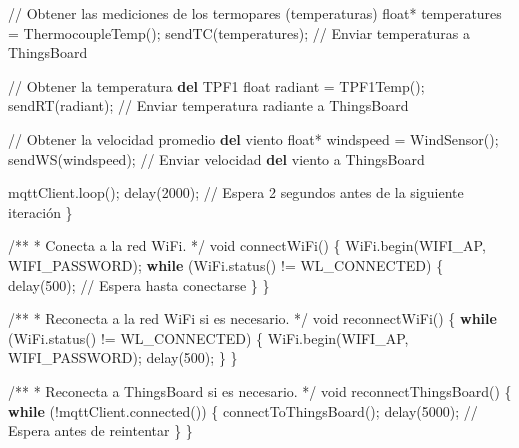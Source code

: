 \documentclass[
  letterpaper,
]{scrbook}
\newenvironment{Shaded}{\begin{snugshade}}{\end{snugshade}}
\newcommand{\BuiltInTok}[1]{\textcolor[rgb]{0.00,0.23,0.31}{#1}}
\newcommand{\ControlFlowTok}[1]{\textcolor[rgb]{0.00,0.23,0.31}{\textbf{#1}}}
\newcommand{\DecValTok}[1]{\textcolor[rgb]{0.68,0.00,0.00}{#1}}
\newcommand{\KeywordTok}[1]{\textcolor[rgb]{0.00,0.23,0.31}{\textbf{#1}}}
\newcommand{\NormalTok}[1]{\textcolor[rgb]{0.00,0.23,0.31}{#1}}
\newcommand{\OperatorTok}[1]{\textcolor[rgb]{0.37,0.37,0.37}{#1}}
\begin{document}
\begin{Shaded}
\begin{Highlighting}[]
  \OperatorTok{//}\NormalTok{ Obtener las mediciones de los termopares (temperaturas)}
  \BuiltInTok{float}\OperatorTok{*}\NormalTok{ temperatures }\OperatorTok{=}\NormalTok{ ThermocoupleTemp()}\OperatorTok{;}
\NormalTok{  sendTC(temperatures)}\OperatorTok{;}    \OperatorTok{//}\NormalTok{ Enviar temperaturas a ThingsBoard}

  \OperatorTok{//}\NormalTok{ Obtener la temperatura }\KeywordTok{del}\NormalTok{ TPF1}
  \BuiltInTok{float}\NormalTok{ radiant }\OperatorTok{=}\NormalTok{ TPF1Temp()}\OperatorTok{;}
\NormalTok{  sendRT(radiant)}\OperatorTok{;}  \OperatorTok{//}\NormalTok{ Enviar temperatura radiante a ThingsBoard}

  \OperatorTok{//}\NormalTok{ Obtener la velocidad promedio }\KeywordTok{del}\NormalTok{ viento}
  \BuiltInTok{float}\OperatorTok{*}\NormalTok{ windspeed }\OperatorTok{=}\NormalTok{ WindSensor()}\OperatorTok{;}
\NormalTok{  sendWS(windspeed)}\OperatorTok{;}      \OperatorTok{//}\NormalTok{ Enviar velocidad }\KeywordTok{del}\NormalTok{ viento a ThingsBoard}

\NormalTok{  mqttClient.loop()}\OperatorTok{;}
\NormalTok{  delay(}\DecValTok{2000}\NormalTok{)}\OperatorTok{;}  \OperatorTok{//}\NormalTok{ Espera }\DecValTok{2}\NormalTok{ segundos antes de la siguiente iteración}
\NormalTok{\}}

\OperatorTok{/**}
 \OperatorTok{*}\NormalTok{ Conecta a la red WiFi.}
 \OperatorTok{*/}
\NormalTok{void connectWiFi() \{}
\NormalTok{  WiFi.begin(WIFI\_AP, WIFI\_PASSWORD)}\OperatorTok{;}
  \ControlFlowTok{while}\NormalTok{ (WiFi.status() }\OperatorTok{!=}\NormalTok{ WL\_CONNECTED) \{}
\NormalTok{    delay(}\DecValTok{500}\NormalTok{)}\OperatorTok{;}  \OperatorTok{//}\NormalTok{ Espera hasta conectarse}
\NormalTok{  \}}
\NormalTok{\}}

\OperatorTok{/**}
 \OperatorTok{*}\NormalTok{ Reconecta a la red WiFi si es necesario.}
 \OperatorTok{*/}
\NormalTok{void reconnectWiFi() \{}
  \ControlFlowTok{while}\NormalTok{ (WiFi.status() }\OperatorTok{!=}\NormalTok{ WL\_CONNECTED) \{}
\NormalTok{    WiFi.begin(WIFI\_AP, WIFI\_PASSWORD)}\OperatorTok{;}
\NormalTok{    delay(}\DecValTok{500}\NormalTok{)}\OperatorTok{;}
\NormalTok{  \}}
\NormalTok{\}}

\OperatorTok{/**}
 \OperatorTok{*}\NormalTok{ Reconecta a ThingsBoard si es necesario.}
 \OperatorTok{*/}
\NormalTok{void reconnectThingsBoard() \{}
  \ControlFlowTok{while}\NormalTok{ (}\OperatorTok{!}\NormalTok{mqttClient.connected()) \{}
\NormalTok{    connectToThingsBoard()}\OperatorTok{;}
\NormalTok{    delay(}\DecValTok{5000}\NormalTok{)}\OperatorTok{;}  \OperatorTok{//}\NormalTok{ Espera antes de reintentar}
\NormalTok{  \}}
\NormalTok{\}}


\end{Highlighting}
\end{Shaded}
\end{document}
